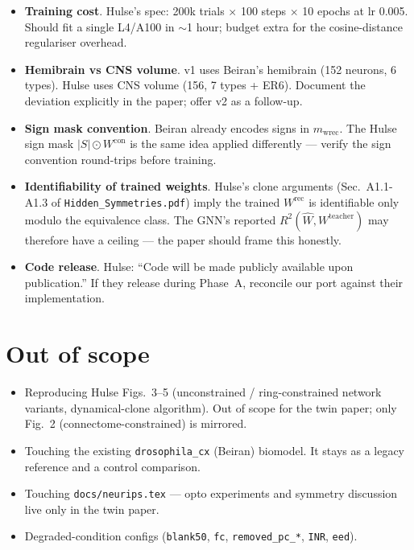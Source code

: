 \documentclass[11pt]{article}
\begin{document}
\begin{itemize}[leftmargin=*]
\item \textbf{Training cost}. Hulse's spec: 200k trials $\times$ 100 steps
  $\times$ 10 epochs at lr 0.005. Should fit a single L4/A100 in $\sim$1
  hour; budget extra for the cosine-distance regulariser overhead.
\item \textbf{Hemibrain vs CNS volume}. v1 uses Beiran's hemibrain
  (152 neurons, 6 types). Hulse uses CNS volume (156, 7 types + ER6).
  Document the deviation explicitly in the paper; offer v2 as a
  follow-up.
\item \textbf{Sign mask convention}. Beiran already encodes signs in
  $m_{\text{wrec}}$. The Hulse sign mask $|S|\odot W^{\text{con}}$ is
  the same idea applied differently --- verify the sign convention round-trips
  before training.
\item \textbf{Identifiability of trained weights}. Hulse's clone
  arguments (Sec.~A1.1-A1.3 of \texttt{Hidden\_Symmetries.pdf}) imply
  the trained $W^{\text{rec}}$ is identifiable only modulo the
  equivalence class. The GNN's reported $R^2(\hat W, W^{\text{teacher}})$
  may therefore have a ceiling --- the paper should frame this
  honestly.
\item \textbf{Code release}. Hulse: ``Code will be made publicly available
  upon publication.'' If they release during Phase~A, reconcile our port
  against their implementation.
\end{itemize}

\section{Out of scope}

\begin{itemize}[leftmargin=*, itemsep=0pt]
\item Reproducing Hulse Figs.~3--5 (unconstrained / ring-constrained
  network variants, dynamical-clone algorithm). Out of scope for the
  twin paper; only Fig.~2 (connectome-constrained) is mirrored.
\item Touching the existing \texttt{drosophila\_cx} (Beiran) biomodel.
  It stays as a legacy reference and a control comparison.
\item Touching \texttt{docs/neurips.tex} --- opto experiments and
  symmetry discussion live only in the twin paper.
\item Degraded-condition configs (\texttt{blank50}, \texttt{fc},
  \texttt{removed\_pc\_*}, \texttt{INR}, \texttt{eed}).
\end{itemize}
\end{document}

